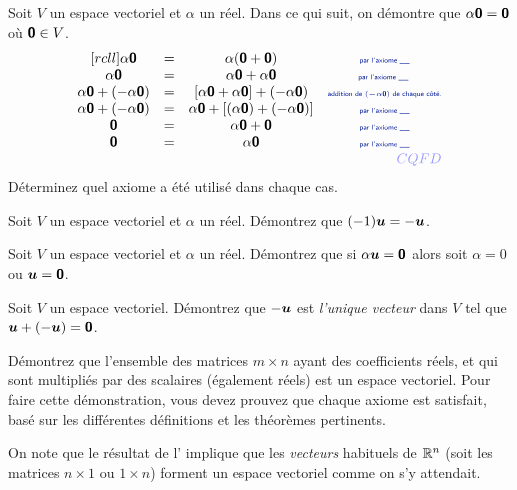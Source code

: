 \begin{exerciceC}
Soit $V$ un espace vectoriel et $\alpha$ un réel. Dans ce qui suit, on démontre que $\alpha\mbox{\textsf{\textbf{{0}}}} = \mbox{\textsf{\textbf{{0}}}}$ 
où $\mbox{\textsf{\textbf{{0}}}} \in V$.
\[
\begin{matrix}[rcll]
\alpha\zero &=& \alpha(\zero + \zero) & \explain{par l'axiome \_\_} \\
\alpha\zero&=& \alpha\zero + \alpha\zero& \explain{par l'axiome \_\_ }\\
\alpha\zero + (-\alpha\zero) &=& [\alpha\zero + \alpha\zero] + (-\alpha\zero)  & \explain{addition de $(-\alpha\zero)$ de chaque côté.}\\
\alpha\zero + (-\alpha\zero) &=& \alpha\zero + [(\alpha\zero) + (-\alpha\zero)]  & \explain{par l'axiome \_\_}\\
\zero &=&  \alpha\zero + \zero&\explain{par l'axiome \_\_} \\
\zero &=& \alpha\zero &\explain{par l'axiome \_\_}\\
&&& \cqfd
\end{matrix}
\]
Déterminez quel axiome a été utilisé dans chaque cas.
\end{exerciceC}
\begin{exerciceC}
Soit $V$ un espace vectoriel et $\alpha$ un réel. Démontrez que $(-1)\boldsymbol{u} = -\boldsymbol{u}$.
\end{exerciceC}
\begin{exerciceC}
Soit $V$ un espace vectoriel et $\alpha$ un réel. Démontrez que si $\alpha\boldsymbol{u} = \mbox{\textsf{\textbf{{0}}}}$ alors soit $\alpha=0$ ou $\boldsymbol{u}=\mbox{\textsf{\textbf{{0}}}}$.
\end{exerciceC}
\begin{exerciceC}
Soit $V$ un espace vectoriel. Démontrez que $-\boldsymbol{u}$ est \textit{l'unique vecteur} dans $V$
tel que $\boldsymbol{u} + (-\boldsymbol{u}) = \mbox{\textsf{\textbf{{0}}}}$.
\end{exerciceC}
\begin{exerciceB}
Démontrez que l'ensemble des matrices $m\times n$ ayant des coefficients réels, et qui sont multipliés par des scalaires (également réels) est un espace vectoriel.  Pour faire cette démonstration, vous devez prouvez que chaque axiome est satisfait, basé sur les différentes définitions et les théorèmes pertinents.\label{mat-esp-vec}
\end{exerciceB}

On note que le résultat de l' implique que les \textit{vecteurs} habituels de $\mathbb{R}^n$ (soit les matrices $n\times 1$ ou $1\times n$) forment un espace vectoriel comme on s'y attendait.

